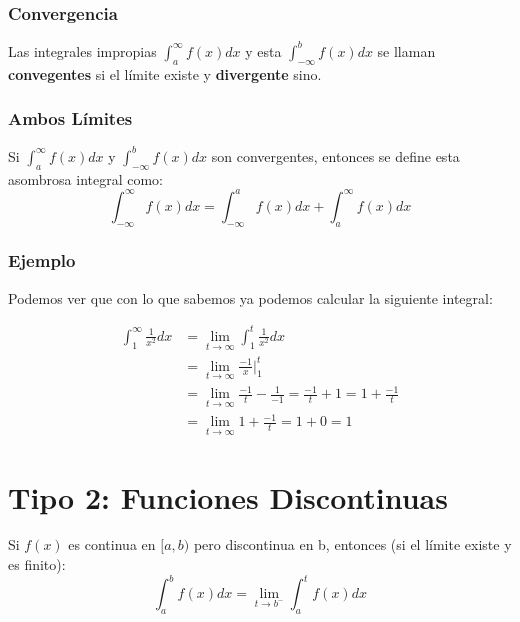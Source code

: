 \documentclass[12pt]{report}                                %
\begin{document}
        \subsubsection{Convergencia}
        Las integrales impropias $\int_a^{\infty}f(x)dx$ y esta $\int_{-\infty}^bf(x)dx$
        se llaman \textbf{convegentes} si el límite existe y  \textbf{divergente} sino.

        \subsubsection{Ambos Límites}
        Si $\int_a^{\infty}f(x)dx$ y $\int_{-\infty}^bf(x)dx$ son convergentes, entonces
        se define esta asombrosa integral como:
        \begin{equation}
            \int_{-\infty}^{\infty} f(x) dx = \int_{-\infty}^{a} f(x) dx + \int_{a}^{\infty} f(x) dx   
        \end{equation}

        \subsubsection{Ejemplo}
        Podemos ver que con lo que sabemos ya podemos calcular la siguiente integral:

        \begin{equation*}
        \begin{split}
            \int_1^{\infty} \frac{1}{x^2} dx & = \lim_{t \to \infty} \int_1^t \frac{1}{x^2} dx \\
            & = \lim_{t \to \infty} \frac{-1}{x} \big\rvert_{1}^{t} \\
            & = \lim_{t \to \infty} \frac{-1}{t} - \frac{1}{-1} = \frac{-1}{t} + 1 = 1 + \frac{-1}{t} \\
            & = \lim_{t \to \infty} 1 + \frac{-1}{t} = 1 + 0 = 1
        \end{split}
        \end{equation*}

        \clearpage

    \clearpage
    \section{Tipo 2: Funciones Discontinuas}

        Si $f(x)$ es continua en $[a, b)$  pero discontinua en b, entonces
        (si el límite existe y es finito):
        \begin{equation}
            \int_a^b f(x) dx = \lim_{t \to b^-} \int_a^t f(x) dx
        \end{equation}
\end{document}
